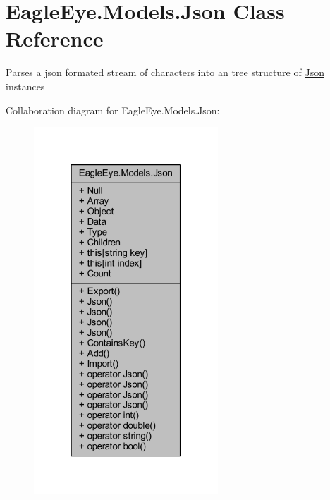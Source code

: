 \hypertarget{class_eagle_eye_1_1_models_1_1_json}{}\section{Eagle\+Eye.\+Models.\+Json Class Reference}
\label{class_eagle_eye_1_1_models_1_1_json}


Parses a json formated stream of characters into an tree structure of \mbox{\hyperlink{class_eagle_eye_1_1_models_1_1_json}{Json}} instances  




Collaboration diagram for Eagle\+Eye.\+Models.\+Json\+:
\nopagebreak
\begin{figure}[H]
\begin{center}
\leavevmode
\includegraphics[width=196pt]{class_eagle_eye_1_1_models_1_1_json__coll__graph}
\end{center}
\end{figure}
